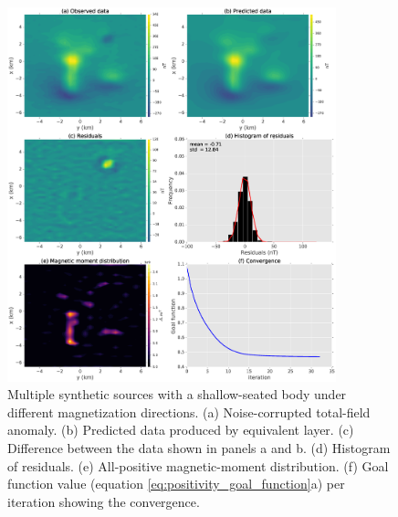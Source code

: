 \begin{figure}
	\centering
	\includegraphics[width=0.85\textwidth]{Fig/unidir_shallow_diff_test/results_compiled_LM_NNLS_magRM.eps}
	\caption{Multiple synthetic sources with a shallow-seated body under different magnetization directions. (a) Noise-corrupted total-field anomaly. (b) Predicted data produced by equivalent layer. (c) Difference between the data shown in panels a and b. (d) Histogram of residuals. (e) All-positive magnetic-moment distribution. (f) Goal function value (equation \ref{eq:positivity_goal_function}a) per iteration showing the convergence.}
	\label{fig:unidir_shallow_diff_test}
\end{figure}

